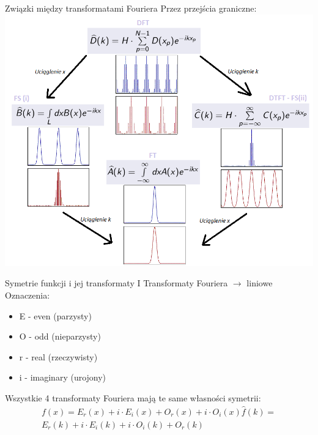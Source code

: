 \begin{frame}{Związki między transformatami Fouriera}
	Przez przejścia graniczne:\\
	\centering
	\includegraphics[height=0.8\textheight]{img/16/przejscia_graniczne.png}
\end{frame}
\begin{frame}{Symetrie funkcji i jej transformaty I}
	Transformaty Fouriera $\to$ liniowe
	\\ Oznaczenia:
	\begin{itemize}
		\item E - even (parzysty)
		\item O - odd (nieparzysty)
		\item r - real (rzeczywisty)
		\item i - imaginary (urojony)
	\end{itemize}
	Wszystkie 4 transformaty Fouriera mają te same własności symetrii:
	\begin{align*}
		f(x) = E_r(x) + i \cdot E_i(x) + O_r(x) + i \cdot O_i(x) \widehat{f}(k) =
		\tag{16.5} \\
		E_r(k) + i \cdot E_i(k) + i \cdot O_i(k) + O_r(k)
		\tag{16.6}
	\end{align*}
\end{frame}
